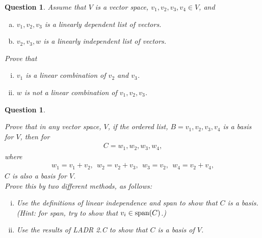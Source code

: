 \documentclass[12pt]{article}
\newtheorem{question}[thm]{Question}
\def\SpanLA{\textnormal{span}}
\begin{document}
\vspace{.3cm}

\begin{question}
	\normalfont
	

	
	Assume that $V$ is a vector space, $v_1,v_2,v_3,v_4\in V$, and
	\begin{enumerate}[(a)]
		\item $v_1,v_2,v_3$ \hspace{.1cm} is a linearly dependent list of vectors.
		\item $v_2,v_3,w$ \hspace{.1cm} is a linearly independent list of vectors.
	\end{enumerate}
	Prove that
	\begin{enumerate}[(i)]
		\item $v_1$ is a linear combination of $v_2$ and $v_3$.
		\item $w$ is not a linear combination of $v_1, v_2, v_3$.
	\end{enumerate}

	
\end{question}

\vspace{.3cm}

\begin{question}\label{que:GeneralVectorSpaceNewBasisFromOld}
	\normalfont
	
	Prove that in any vector space, $V$, if the ordered list, $B=v_1, v_2, v_3, v_4$ \hspace{.1cm} is a basis for $V$, then for 
	\begin{align*}
		C= w_1, w_2, w_3, w_4 ,
	\end{align*}
	where
	\begin{align*}
		w_1=v_1+v_2,\ \  w_2=v_2+v_3,\ \  w_3=v_2,\ \  w_4=v_2 + v_4,
	\end{align*}
	$C$ is also a basis for $V$.  \\
	
	\noindent Prove this by two different methods, as follows:
	
	\begin{enumerate}[(i)]
		\item Use the definitions of linear independence and span to show that $C$ is a basis. (Hint: for span, try to show that $v_i\in\SpanLA(C)$.)
		
		\item Use the results of LADR 2.C to show that $C$ is a basis of $V$.
	\end{enumerate}
	
	
\end{question}









\end{document}
